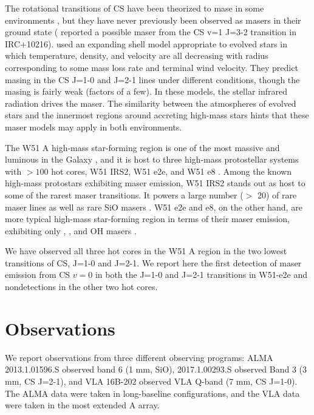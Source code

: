 \documentclass[twocolumn]{aastex62}
\begin{document}
The rotational transitions of CS have been theorized to mase
in some environments \citep{Schoenberg1988a}, but they have
never previously been observed as masers in their ground state
(\citealt{Highberger2000a} reported a possible maser from the CS v=1 J=3-2
transition in IRC+10216).
\citet{Schoenberg1988a}
used an expanding shell model appropriate to evolved stars in which
temperature, density, and velocity are all decreasing with radius corresponding
to some mass loss rate and terminal wind velocity. They predict masing in the
CS J=1-0 and J=2-1 lines under different conditions, though the masing is
fairly weak (factors of a few).  In these models, the stellar infrared
radiation drives the maser.  The similarity between the atmospheres
of evolved stars and the innermost regions around accreting high-mass stars
hints that these maser models may apply in both environments.


The W51 A high-mass star-forming region is one of the most massive and luminous
in the Galaxy \citep{Ginsburg2017b}, and it is host to three high-mass
protostellar systems with $>100$ \msun hot cores, W51 IRS2, W51 e2e, and W51 e8
\citep{Ginsburg2017a}.  Among the known high-mass protostars exhibiting maser
emission, W51 IRS2 stands out as host to some of the rarest maser transitions.
It powers a large number ($>$ 20) of rare \ammonia maser lines as well as rare
SiO masers \citep{Henkel2013a,Hasegawa1986a,Eisner2002a}.  W51 e2e and e8, on
the other hand, are more typical high-mass star-forming region in terms of
their maser emission, exhibiting only \methanol, \water, and OH masers
\citep{Goddi2016a}.

We have observed all three hot cores in the W51 A region in the two lowest
transitions of CS, J=1-0 and J=2-1.  We report here the first detection of
maser emission from CS $v=0$ in both the J=1-0 and J=2-1 transitions in
W51-e2e and nondetections in the other two hot cores.



\section{Observations}
\label{sec:observations}
We report observations from three different observing programs:
ALMA 2013.1.01596.S \citep{Goddi2018a} observed band 6 (1 mm, SiO), 2017.1.00293.S
observed Band 3 (3 mm, CS J=2-1), and VLA 16B-202 observed VLA Q-band (7 mm, CS J=1-0).
The ALMA data were taken in long-baseline configurations, and the VLA data
were taken in the most extended A array.
\end{document}
